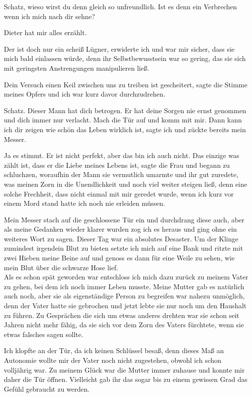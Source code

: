 \documentclass[11pt, a5paper]{article}
\begin{document}
\begin{spacing}{1.2}
		\frqq Schatz, wieso wirst du denn gleich so unfreundlich. Ist es denn ein Verbrechen wenn ich mich nach dir sehne?\flqq
		
		\frqq Dieter hat mir alles erzählt.\flqq
		
		\frqq Der ist doch nur ein scheiß Lügner\flqq , erwiderte ich und war mir sicher, dass sie mich bald einlassen würde, denn ihr Selbstbewusstsein war so gering, das sie sich mit geringsten Anstrengungen manipulieren ließ.
		
		\frqq Dein Versuch einen Keil zwischen uns zu treiben ist gescheitert\flqq , sagte die Stimme meines Opfers und ich war kurz davor durchzudrehen.
		
		\frqq Schatz. Dieser Mann hat dich betrogen. Er hat deine Sorgen nie ernst genommen und dich immer nur verlacht. Mach die Tür auf und komm mit mir. Dann kann ich dir zeigen wie schön das Leben wirklich ist\flqq, sagte ich und zückte bereits mein Messer.
		
		\frqq Ja es stimmt. Er ist nicht perfekt, aber das bin ich auch nicht. Das einzige was zählt ist, dass er die Liebe meines Lebens ist\flqq , sagte die Frau und begann zu schluchzen, woraufhin der Mann sie vermutlich umarmte und ihr gut zuredete, was meinen Zorn in die Unendlichkeit und noch viel weiter steigen ließ, denn eine solche Frechheit, dass nicht einmal mit mir geredet wurde, wenn ich kurz vor einem Mord stand hatte ich noch nie erleiden müssen.
		
		Mein Messer stach auf die geschlossene Tür ein und durchdrang diese auch, aber als meine Gedanken wieder klarer wurden zog ich es heraus und ging ohne ein weiteres Wort zu sagen. Dieser Tag war ein absolutes Desaster. Um der Klinge zumindest irgendein Blut zu bieten setzte ich mich auf eine Bank und ritzte mit zwei Hieben meine Beine auf und genoss es dann für eine Weile zu sehen, wie mein Blut über die schwarze Hose lief.\\
		
		Als es schon spät geworden war entschloss ich mich dazu zurück zu meinem Vater zu gehen, bei dem ich noch immer Leben musste. Meine Mutter gab es natürlich auch noch, aber sie als eigenständige Person zu begreifen war nahezu unmöglich, denn der Vater hatte sie gebrochen und jetzt lebte sie nur noch um den Haushalt zu führen. Zu Gesprächen die sich um etwas anderes drehten war sie schon seit Jahren nicht mehr fähig, da sie sich vor dem Zorn des Vaters fürchtete, wenn sie etwas falsches sagen sollte.
		
		Ich klopfte an der Tür, da ich keinen Schlüssel besaß, denn dieses Maß an Autonomie wollte mir der Vater noch nicht zugestehen, obwohl ich schon volljährig war. Zu meinem Glück war die Mutter immer zuhause und konnte mir daher die Tür öffnen. Vielleicht gab ihr das sogar bis zu einem gewissen Grad das Gefühl gebraucht zu werden.
		

\end{spacing}
\end{document}

